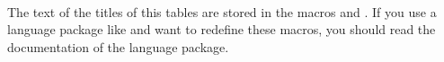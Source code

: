 \begin{Declaration}
  \\
\end{Declaration}
%
%
The text of the titles of this tables are stored in the macros
 and . If you use a
language package like  and want to redefine these
macros, you should read the documentation of the language package.
%
%
%
